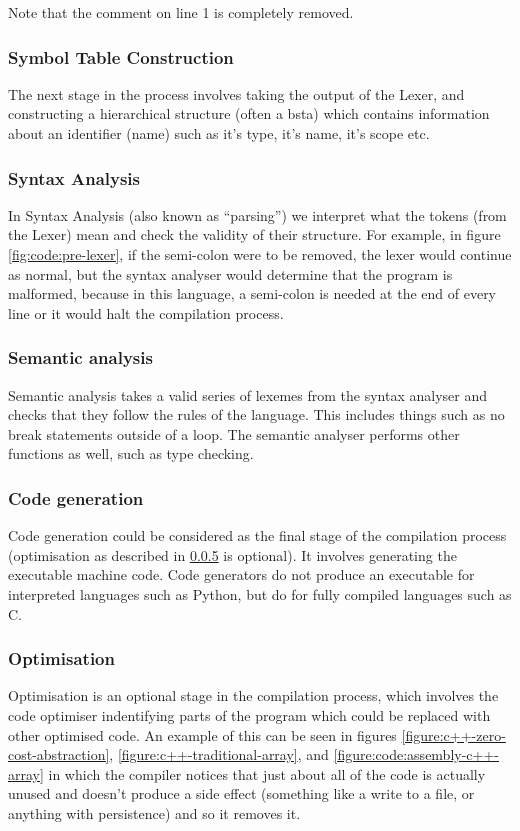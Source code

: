 \documentclass[a4paper]{article}
\begin{document}
Note that the comment on line 1 is completely removed.

\subsubsection{Symbol Table Construction}
The next stage in the process involves taking the output of the Lexer, and constructing a hierarchical structure (often a \gls{bsta}) which contains information about an identifier (name) such as it’s type, it’s name, it’s scope etc.

\subsubsection{Syntax Analysis}
In Syntax Analysis (also known as ``parsing'') we interpret what the tokens (from the Lexer) mean and check the validity of their structure. For example, in figure \ref{fig:code:pre-lexer}, if the semi-colon were to be removed, the lexer would continue as normal, but the syntax analyser would determine that the program is malformed, because in this language, a semi-colon is needed at the end of every line or it would halt the compilation process.
\subsubsection{Semantic analysis}
Semantic analysis takes a valid series of lexemes from the syntax analyser and checks that they follow the rules of the language. This includes things such as no break statements outside of a loop. The semantic analyser performs other functions as well, such as type checking.

\subsubsection{Code generation}
Code generation could be considered as the final stage of the compilation process (optimisation as described in \ref{stages-of-compilation:optimisation} is optional). It involves generating the executable machine code. Code generators do not produce an executable for interpreted languages such as Python, but do for fully compiled languages such as C.
\subsubsection{Optimisation}\label{stages-of-compilation:optimisation}
Optimisation is an optional stage in the compilation process, which involves the code optimiser indentifying parts of the program which could be replaced with other optimised code. An example of this can be seen in figures \ref{figure:c++-zero-cost-abstraction}, \ref{figure:c++-traditional-array}, and \ref{figure:code:assembly-c++-array} in which the compiler notices that just about all of the code is actually unused and doesn't produce a side effect (something like a write to a file, or anything with persistence) and so it removes it.
\end{document}
